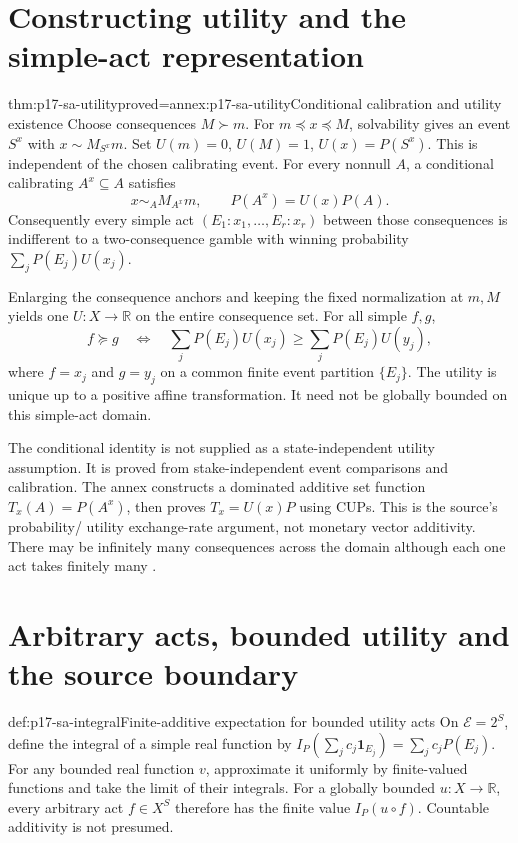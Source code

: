 \section{Constructing utility and the simple-act representation}
\label{sec:p17-sa-utility}

\begin{hbtheorem}{thm:p17-sa-utility}{proved=annex:p17-sa-utility}{Conditional calibration and utility existence}
Choose consequences \(M\succ m\).
For \(m\preceq x\preceq M\), solvability gives an event
\(S^x\) with \(x\sim M_{S^x}m\).
Set \(U(m)=0\), \(U(M)=1\), \(U(x)=P(S^x)\).
This is independent of the chosen calibrating event.
For every nonnull \(A\), a conditional calibrating
\(A^x\subseteq A\) satisfies
\[
 x\sim_A M_{A^x}m,\qquad P(A^x)=U(x)P(A).
\]
Consequently every simple act
\((E_1:x_1,\ldots,E_r:x_r)\) between those consequences
is indifferent to a two-consequence gamble with winning
probability \(\sum_jP(E_j)U(x_j)\).

Enlarging the consequence anchors and keeping the fixed
normalization at \(m,M\) yields one
\(U:X\to\mathbb R\) on the entire consequence set.
For all simple \(f,g\),
\[
 f\succeq g\quad\Longleftrightarrow\quad
 \sum_jP(E_j)U(x_j)\geq
 \sum_jP(E_j)U(y_j),
\]
where \(f=x_j\) and \(g=y_j\) on a common finite event
partition \(\{E_j\}\).
The utility is unique up to a positive affine transformation.
It need not be globally bounded on this simple-act domain.
\end{hbtheorem}

The conditional identity is not supplied as a state-independent
utility assumption. It is proved from stake-independent event
comparisons and calibration. The annex constructs a dominated
additive set function \(T_x(A)=P(A^x)\), then proves
\(T_x=U(x)P\) using CUPs. This is the source's probability/
utility exchange-rate argument, not monetary vector additivity.
There may be infinitely many consequences across the domain
although each one act takes finitely many
\cite[pp.\ 11--14]{AbdellaouiWakker2020SavageSA}.

\section{Arbitrary acts, bounded utility and the source boundary}
\label{sec:p17-sa-general-acts}

\begin{hbdefinition}{def:p17-sa-integral}{Finite-additive expectation for bounded utility acts}
On \(\mathcal E=2^S\), define the integral of a simple real
function by \(I_P(\sum_jc_j\mathbf1_{E_j})=\sum_jc_jP(E_j)\).
For any bounded real function \(v\), approximate it uniformly
by finite-valued functions and take the limit of their integrals.
For a globally bounded \(u:X\to\mathbb R\), every
arbitrary act \(f\in X^S\) therefore has the finite value
\(I_P(u\circ f)\). Countable additivity is not presumed.
\end{hbdefinition}

